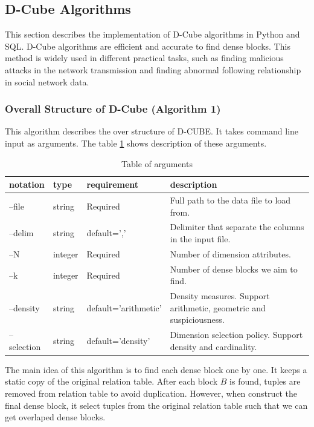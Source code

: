 \subsection{D-Cube Algorithms}
This section describes the implementation of D-Cube algorithms in Python and SQL. D-Cube algorithms are efficient and accurate to find dense blocks. This method is widely used in different practical tasks, such as finding malicious attacks in the network transmission and finding abnormal following relationship in social network data.

\subsubsection{Overall Structure of D-Cube (Algorithm 1)}
This algorithm describes the over structure of D-CUBE. It takes command line input as arguments. The table \ref{table:2} shows description of these arguments.
 
\begin{table}[h!]
\centering
\begin{tabular}{|p{2cm}|p{2cm}|p{4cm}|p{5cm}|}
 \hline
 notation & type & requirement & description \\ [0.5ex] 
 \hline\hline
 --file & string & Required & Full path to the data file to load from. \\ 
 --delim & string & default=',' & Delimiter that separate the columns in the input file. \\
 --N & integer & Required & Number of dimension attributes.\\
 --k & integer & Required & Number of dense blocks we aim to find. \\
 --density & string & default='arithmetic' & Density measures. Support arithmetic, geometric and suspiciousness. \\
 --selection & string & default='density' & Dimension selection policy. Support density and cardinality.\\ [1ex] 
 \hline
\end{tabular}
\caption{Table of arguments}
\label{table:2}
\end{table}

The main idea of this algorithm is to find each dense block one by one. It keeps a static copy of the original relation table. After each block $B$ is found, tuples are removed from relation table to avoid duplication. However, when construct the final dense block, it select tuples from the original relation table such that we can get overlaped dense blocks.

